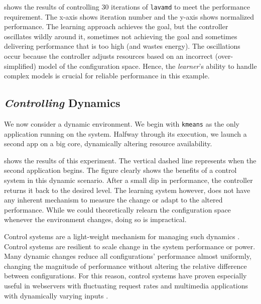  shows the results of controlling 30
iterations of \texttt{lavamd} to meet the performance requirement.
The x-axis shows iteration number and the y-axis shows normalized
performance.  The learning approach achieves the goal, but the
controller oscillates wildly around it, sometimes not achieving the
goal and sometimes delivering performance that is too high (and wastes
energy). The oscillations occur because the controller adjusts
resources based on an incorrect (over-simplified) model of the
configuration space. Hence, the \emph{learner}'s ability to handle
complex models is crucial for reliable performance in this example.


\subsection{\emph{Controlling} Dynamics}
We now consider a dynamic environment.  We begin with \texttt{kmeans}
as the only application running on the system.  Halfway through its
execution, we launch a second app on a big core, dynamically altering
resource availability.

 shows the results of this experiment.
The vertical dashed line represents when the second application
begins.  The figure clearly shows the benefits of a control system in
this dynamic scenario.  After a small dip in performance, the
controller returns it back to the desired level.  The learning system
however, does not have any inherent mechanism to measure the change or
adapt to the altered performance.  While we could theoretically
relearn the configuration space whenever the environment changes,
doing so is impractical.

Control systems are a light-weight mechanism for managing such
dynamics \cite{Hellerstein2004a}. Control systems are resilient to
scale change in the system performance or power.  Many dynamic changes
reduce all configurations' performance almost uniformly, changing the
magnitude of performance without altering the relative difference
between configurations.  For this reason, control systems have proven
especially useful in webservers with fluctuating request rates
\cite{Horvarth,LuEtAl-2006a,SunDaiPan-2008a} and multimedia
applications with dynamically varying inputs
\cite{TCST,Agilos,grace2}.

